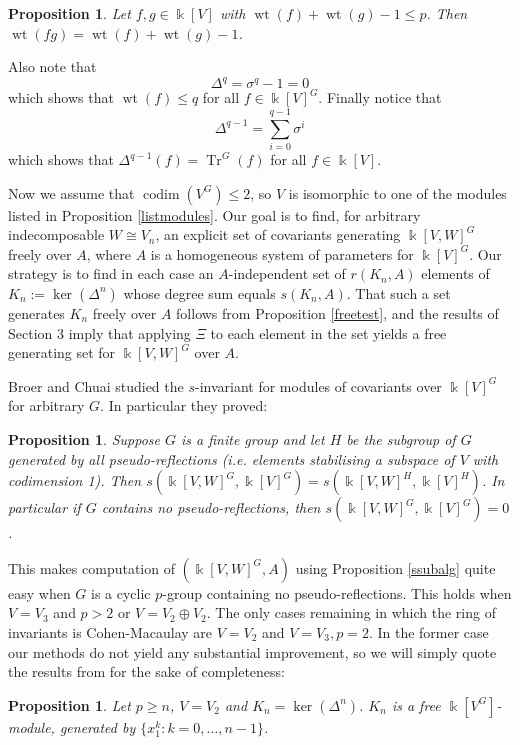 \documentclass[a4paper]{amsart}
\newcommand{\kk}{\Bbbk}
\def\codim{\operatorname{codim}}
\def\wt{\operatorname{wt}}
\def\Tr{\operatorname{Tr}}
\newtheorem{prop}[Lemma]{Proposition}
\newtheorem*{Corollary of Conjecture}{Corollary of Conjecture}
\theoremstyle{definition}
\theoremstyle{remark}
\theoremstyle{Acknowledgments}
\begin{document}
\begin{prop}\label{weightproduct} Let $f, g \in \kk[V]$ with $\wt(f)+\wt(g)-1 \leq p$. Then $\wt(fg) = \wt(f)+\wt(g)-1$.
\end{prop}

Also note that
\[\Delta^q = \sigma^q-1=0\] which shows that $\wt(f) \leq q$ for all $f \in \kk[V]^G$. Finally notice that
\begin{equation}\label{trans} \Delta^{q-1} = \sum_{i=0}^{q-1} \sigma^i \end{equation} which shows that $\Delta^{q-1}(f) = \Tr^G(f)$ for all $f \in \kk[V]$.

Now we assume that $\codim(V^G) \leq 2$, so $V$ is isomorphic to one of the modules listed in Proposition \ref{listmodules}. Our goal is to find, for arbitrary indecomposable $W \cong V_n$, an explicit set of covariants generating $\kk[V,W]^G$ freely over $A$, where $A$ is a homogeneous system of parameters for $\kk[V]^G$. Our strategy is to find in each case an $A$-independent set of $r(K_n,A)$ elements of $K_n:= \ker(\Delta^n)$ whose degree sum equals $s(K_n,A)$. That such a set generates $K_n$ freely over $A$ follows from Proposition \ref{freetest}, and the results of Section 3 imply that applying $\Xi$ to each element in the set yields a free generating set for $\kk[V,W]^G$ over $A$.

Broer and Chuai studied the $s$-invariant for modules of covariants over $\kk[V]^G$ for arbitrary $G$. In particular they proved:

\begin{prop}\label{nopseudoref} Suppose $G$ is a finite group and let $H$ be the subgroup of $G$ generated by all pseudo-reflections (i.e. elements stabilising a subspace of $V$ with codimension 1). Then $s(\kk[V,W]^G,\kk[V]^G) = s(\kk[V,W]^H,\kk[V]^H)$. In particular if $G$ contains no pseudo-reflections, then $s(\kk[V,W]^G,\kk[V]^G) =0$.
\end{prop}

This makes computation of $(\kk[V,W]^G,A)$ using Proposition \ref{ssubalg} quite easy when $G$ is a cyclic $p$-group containing no pseudo-reflections. This holds when $V = V_3$ and $p>2$ or $V = V_2 \oplus V_2$. The only cases remaining in which the ring of invariants is Cohen-Macaulay are $V=V_2$ and $V = V_3, p=2$. In the former case our methods do not yield any substantial improvement, so we will simply quote the results from \cite{ElmerCov} for the sake of completeness:

\begin{prop} Let $p \geq n$, $V=V_2$ and $K_n = \ker(\Delta^n)$.
$K_n$ is a free $\kk[V^G]$-module, generated by $\{x_1^k: k=0, \ldots, n-1\}$.
\end{prop}
\end{document}
